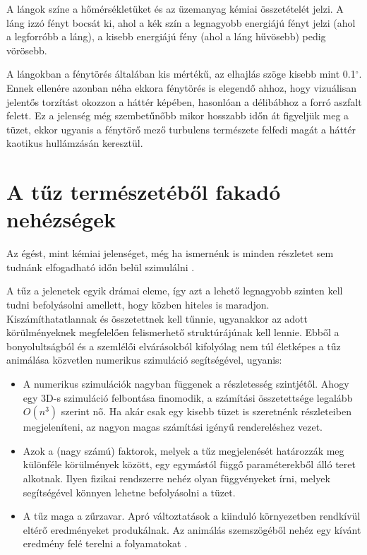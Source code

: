 A lángok színe a hőmérsékletüket és az üzemanyag kémiai összetételét jelzi. A láng izzó fényt bocsát ki, ahol a kék szín a legnagyobb energiájú fényt jelzi (ahol a legforróbb a láng), a kisebb energiájú fény (ahol a láng hűvösebb) pedig vörösebb.

\cite{firePhysics1}

A lángokban a fénytörés általában kis mértékű, az elhajlás szöge kisebb mint 0.1$^{\circ}$. Ennek ellenére azonban néha ekkora fénytörés is elegendő ahhoz, hogy vizuálisan jelentős torzítást okozzon a háttér képében, hasonlóan a délibábhoz a forró aszfalt felett. Ez a jelenség még szembetűnőbb mikor hosszabb időn át figyeljük meg a tüzet, ekkor ugyanis a fénytörő mező turbulens természete felfedi magát a háttér kaotikus hullámzásán keresztül.
\cite{swhThreeDimensionalReconst}

\section{A tűz természetéből fakadó nehézségek}
Az égést, mint kémiai jelenséget, még ha ismernénk is minden részletet sem tudnánk elfogadható időn belül szimulálni  \cite{firestarter}.

A tűz a jelenetek egyik drámai eleme, így azt a lehető legnagyobb szinten kell tudni befolyásolni amellett, hogy közben hiteles is maradjon. Kiszámíthatatlannak és összetettnek kell tűnnie, ugyanakkor az adott körülményeknek megfelelően felismerhető struktúrájúnak kell lennie. Ebből a bonyolultságból és a szemlélői elvárásokból kifolyólag nem túl életképes a tűz animálása közvetlen numerikus szimuláció segítségével, ugyanis:
\begin{itemize}
\item
A numerikus szimulációk nagyban függenek a részletesség szintjétől. Ahogy egy 3D-s szimuláció felbontása finomodik, a számítási összetettsége legalább $O(n^3)$ szerint nő. Ha akár csak egy kisebb tüzet is szeretnénk részleteiben megjeleníteni, az nagyon magas számítási igényű rendereléshez vezet.
\item
Azok a (nagy számú) faktorok, melyek a tűz megjelenését határozzák meg különféle körülmények között, egy egymástól függő paraméterekből álló teret alkotnak. Ilyen fizikai rendszerre nehéz olyan függvényeket írni, melyek segítségével könnyen lehetne befolyásolni a tüzet. 
\item
A tűz maga a zűrzavar. Apró változtatások a kiinduló környezetben rendkívül eltérő eredményeket produkálnak. Az animálás szemszögéből nehéz egy kívánt eredmény felé terelni a folyamatokat \cite{ArNiStructuralModeling}.
\end{itemize}

